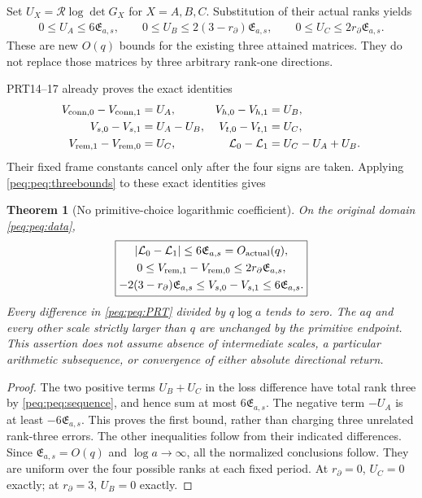 \documentclass[11pt,a4paper]{article}
\newtheorem{theorem}{Theorem}[section]
\begin{document}
Set $U_X=\mathcal R\log\det G_X$ for $X=A,B,C$. Substitution of their actual ranks yields
\begin{equation}
\boxed{\begin{gathered}
 0\le U_A\le6\mathfrak E_{a,s},\qquad
 0\le U_B\le2(3-r_\partial)\mathfrak E_{a,s},\qquad
 0\le U_C\le2r_\partial\mathfrak E_{a,s}.
\end{gathered}}\label{peq:peq:threebounds}
\end{equation}
These are new $O(q)$ bounds for the existing three attained matrices. They do not replace those matrices by three arbitrary rank-one directions.

PRT14--17 already proves the exact identities
\begin{equation}
\begin{aligned}
 V_{{\rm conn},0}-V_{{\rm conn},1}&=U_A,&
 V_{h,0}-V_{h,1}&=U_B,\\
 V_{s,0}-V_{s,1}&=U_A-U_B,&
 V_{t,0}-V_{t,1}&=U_C,\\
 V_{{\rm rem},1}-V_{{\rm rem},0}&=U_C,&
 \mathcal L_0-\mathcal L_1&=U_C-U_A+U_B.
\end{aligned}\label{peq:peq:PRT}
\end{equation}
Their fixed frame constants cancel only after the four signs are taken. Applying \eqref{peq:peq:threebounds} to these exact identities gives
\begin{theorem}[No primitive-choice logarithmic coefficient]
On the original domain \eqref{peq:peq:data},
\begin{equation}
\boxed{\begin{gathered}
 |\mathcal L_0-\mathcal L_1|\le6\mathfrak E_{a,s}=O_{\rm actual}(q),\\
 0\le V_{{\rm rem},1}-V_{{\rm rem},0}
                   \le2r_\partial\mathfrak E_{a,s},\\
 -2(3-r_\partial)\mathfrak E_{a,s}
 \le V_{s,0}-V_{s,1}\le6\mathfrak E_{a,s}.
\end{gathered}}\label{peq:peq:result}
\end{equation}
Every difference in \eqref{peq:peq:PRT} divided by $q\log a$ tends to zero. The $aq$ and every other scale strictly larger than $q$ are unchanged by the primitive endpoint. This assertion does not assume absence of intermediate scales, a particular arithmetic subsequence, or convergence of either absolute directional return.
\end{theorem}
\begin{proof}
The two positive terms $U_B+U_C$ in the loss difference have total rank three by \eqref{peq:peq:sequence}, and hence sum at most $6\mathfrak E_{a,s}$. The negative term $-U_A$ is at least $-6\mathfrak E_{a,s}$. This proves the first bound, rather than charging three unrelated rank-three errors. The other inequalities follow from their indicated differences. Since $\mathfrak E_{a,s}=O(q)$ and $\log a\to\infty$, all the normalized conclusions follow. They are uniform over the four possible ranks at each fixed period. At $r_\partial=0$, $U_C=0$ exactly; at $r_\partial=3$, $U_B=0$ exactly.
\end{proof}
\end{document}
